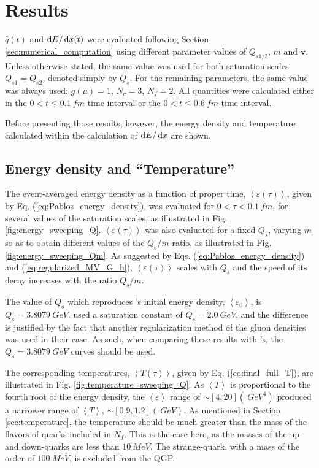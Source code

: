 \chapter{Results}

$\hat{q}(t)$ and $\diff E / \diff x (t)$ were evaluated following Section  \ref{sec:numerical_computation} using different parameter values of $Q_{s1/2}$, $m$ and $\mathbf{v}$. Unless otherwise stated, the same value was used for both saturation scales $Q_{s1} = Q_{s2}$, denoted simply by $Q_s$. For the remaining parameters, the same value was always used: $g(\mu)=1$, $N_c = 3$, $N_f = 2$. All quantities were calculated either in the $0 < t\leq \qty{0.1}{fm}$ time interval or the $0 < t \leq \qty{0.6}{fm}$ time interval.

Before presenting those results, however, the energy density and temperature calculated within the calculation of $\diff E / \diff x$ are shown.

\section{Energy density and ``Temperature''}
The event-averaged energy density as a function of proper time, $\left< \varepsilon (\tau) \right>$, given by Eq. (\ref{eq:Pablos_energy_density}), was evaluated for $0 < \tau < \qty{0.1}{fm}$, for several values of the saturation scales, as illustrated in Fig. \ref{fig:energy_sweeping_Q}. $\left< \varepsilon (\tau) \right>$ was also evaluated for a fixed $Q_s$, varying $m$ so as to obtain different values of the $Q_s/m$ ratio, as illustrated in Fig. \ref{fig:energy_sweeping_Qm}. As suggested by Eqs. (\ref{eq:Pablos_energy_density}) and (\ref{eq:regularized_MV_G_h}), $\left< \varepsilon (\tau) \right>$ scales with $Q_s$ and the speed of its decay increases with the ratio $Q_s/m$.

The value of $Q_s$ which reproduces \cite{Carrington_2022}'s initial energy density, $\left<\varepsilon_0 \right>$, is $Q_s = \qty{3.8079}{GeV}$. \cite{Carrington_2022} used a saturation constant of $Q_s = \qty{2.0}{GeV}$, and the difference is justified by the fact that another regularization method of the gluon densities was used in their case. As such, when comparing these results with \cite{Carrington_2022}'s, the $Q_s = \qty{3.8079}{GeV}$ curves should be used.

The corresponding temperatures, $\left<T(\tau) \right>$, given by Eq. (\ref{eq:final_full_T}), are illustrated in Fig. \ref{fig:temperature_sweeping_Q}. As $\left<T \right>$ is proportional to the fourth root of the energy density, the $\left< \varepsilon \right>$ range of $\sim [4,20](\qty{}{GeV^4})$ produced a narrower range of $\left<T \right>$, $\sim [0.9,1.2](\qty{}{GeV})$. As mentioned in Section \ref{sec:temperature}, the temperature should be much greater than the mass of the flavors of quarks included in $N_f$. This is the case here, as the masses of the up- and down-quarks are less than $\qty{10}{MeV}$. The strange-quark, with a mass of the order of $\qty{100}{MeV}$, is excluded from the \gls{QGP}. \cite{PDG_2024}

